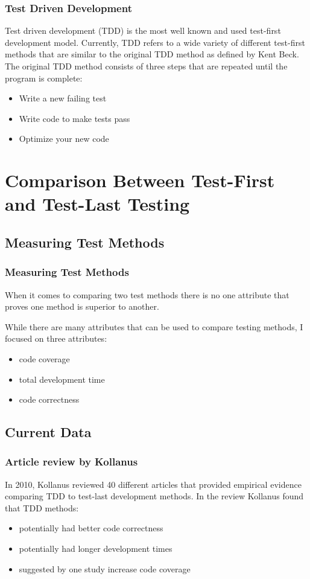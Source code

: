 \documentclass{beamer}
\newcommand{\linespace}{\vskip 0.25cm}
\begin{document}
\begin{frame}
\frametitle{Test Driven Development}
Test driven development (TDD) is the most well known and used test-first development model.  Currently, TDD refers to a wide variety of different test-first methods that are similar to the original TDD method as defined by Kent Beck.
\linespace
The original TDD method consists of three steps that are repeated until the program is complete:
\begin{itemize}
\item Write a new failing test
\item Write code to make tests pass
\item Optimize your new code
\end{itemize}
\linespace

\end{frame}

\section[Comparison of Testing Methods]{Comparison Between Test-First and Test-Last Testing}

\subsection{Measuring Test Methods}

\begin{frame}
\frametitle{Measuring Test Methods}
When it comes to comparing two test methods there is no one attribute that proves one method is superior to another.

\linespace

While there are many attributes that can be used to compare testing methods, I focused on three attributes:
\begin{itemize}
\item code coverage
\item total development time
\item code correctness
\end{itemize}
\end{frame}

\subsection{Current Data}

\begin{frame}
\frametitle{Article review by Kollanus}
In 2010, Kollanus reviewed 40 different articles that provided empirical evidence comparing TDD to test-last development methods.
\linespace
\linespace
\linespace
In the review Kollanus found that TDD methods:
\begin{itemize}
\item potentially had better code correctness
\item potentially had longer development times
\item suggested by one study increase code coverage
\end{itemize}
\end{frame}
\end{document}
